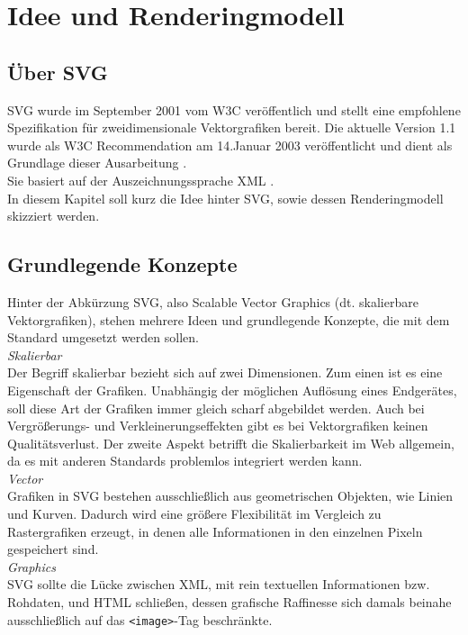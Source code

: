 \section{Idee und Renderingmodell}
\subsection{Über SVG}
SVG wurde im September 2001 vom W3C veröffentlich und stellt eine empfohlene Spezifikation für zweidimensionale Vektorgrafiken bereit. Die aktuelle Version 1.1 wurde als W3C Recommendation am 14.Januar 2003 veröffentlicht und dient als Grundlage dieser Ausarbeitung \cite{svg:2003}.\\
Sie basiert auf der Auszeichnungssprache XML \cite{xml:2008}.\\
In diesem Kapitel soll kurz die Idee hinter SVG, sowie dessen Renderingmodell skizziert werden.

\subsection{Grundlegende Konzepte}
Hinter der Abkürzung SVG, also Scalable Vector Graphics (dt. skalierbare Vektorgrafiken), stehen mehrere Ideen und grundlegende Konzepte, die mit dem Standard umgesetzt werden sollen.\\

\textit{Skalierbar}\\
Der Begriff skalierbar bezieht sich auf zwei Dimensionen. Zum einen ist es eine Eigenschaft der Grafiken. Unabhängig der möglichen Auflösung eines Endgerätes, soll diese Art der Grafiken immer gleich scharf abgebildet werden. Auch bei Vergrößerungs- und Verkleinerungseffekten gibt es bei Vektorgrafiken keinen Qualitätsverlust.
Der zweite Aspekt betrifft die Skalierbarkeit im Web allgemein, da es mit anderen Standards problemlos integriert werden kann.\\

\emph{Vector}\\
Grafiken in SVG bestehen ausschließlich aus geometrischen Objekten, wie Linien und Kurven. Dadurch wird eine größere Flexibilität im Vergleich zu Rastergrafiken erzeugt, in denen alle Informationen in den einzelnen Pixeln gespeichert sind.\\

\emph{Graphics}\\
SVG sollte die Lücke zwischen XML, mit rein textuellen Informationen bzw. Rohdaten, und HTML schließen, dessen grafische Raffinesse sich damals beinahe ausschließlich auf das \texttt{<image>}-Tag beschränkte.

